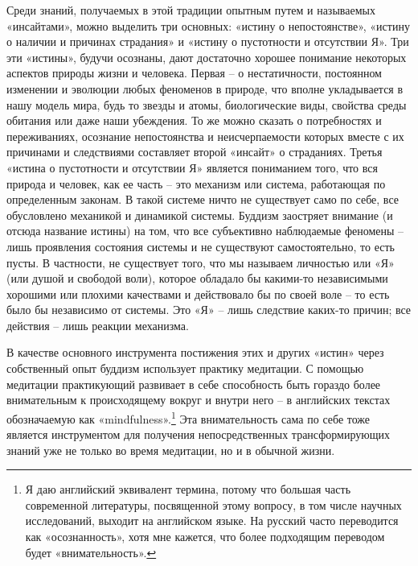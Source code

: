 \documentclass[12pt,a4paper]{report}
\begin{document}
\noindent Среди знаний, получаемых в этой традиции опытным путем и называемых «инсайтами», можно выделить три основных: «истину о непостоянстве», «истину о наличии и причинах страдания» и «истину о пустотности и отсутствии Я». Три эти «истины», будучи осознаны, дают достаточно хорошее понимание некоторых аспектов природы жизни и человека. Первая -- о нестатичности, постоянном изменении и эволюции любых феноменов в природе, что вполне укладывается в нашу модель мира, будь то звезды и атомы, биологические виды, свойства среды обитания или даже наши убеждения. То же можно сказать о потребностях и переживаниях, осознание непостоянства и неисчерпаемости которых вместе с их причинами и следствиями составляет второй «инсайт» о страданиях. Третья «истина о пустотности и отсутствии Я» является пониманием того, что вся природа и человек, как ее часть -- это механизм или система, работающая по определенным законам. В такой системе ничто не существует само по себе, все обусловлено механикой и динамикой системы. Буддизм заостряет внимание (и отсюда название истины) на том, что все субъективно наблюдаемые феномены -- лишь проявления состояния системы и не существуют самостоятельно, то есть пусты. В частности, не существует того, что мы называем личностью или «Я» (или душой и свободой воли), которое обладало бы какими-то независимыми хорошими или плохими качествами и действовало бы по своей воле -- то есть было бы независимо от системы. Это «Я» -- лишь следствие каких-то причин; все действия -- лишь реакции механизма.

\noindent В качестве основного инструмента постижения этих и других «истин» через собственный опыт буддизм использует практику медитации. С помощью медитации практикующий развивает в себе способность быть гораздо более внимательным к происходящему вокруг и внутри него -- в английских текстах обозначаемую как «mindfulness».\footnote{Я даю английский эквивалент термина, потому что большая часть современной литературы, посвященной этому вопросу, в том числе научных исследований, выходит на английском языке. На русский часто переводится как «осознанность», хотя мне кажется, что более подходящим переводом будет «внимательность».} Эта внимательность сама по себе тоже является инструментом для получения непосредственных трансформирующих знаний уже не только во время медитации, но и в обычной жизни.
\end{document}
